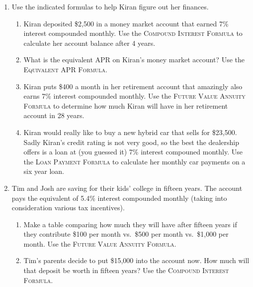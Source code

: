 \begin{enumerate}
\item Use the indicated formulas to help Kiran figure out her finances.
\begin{enumerate}
\item Kiran deposited \$2,500 in a money market account that earned 7\% interest compounded monthly.  Use the \textsc{Compound Interest Formula} to calculate her account balance after 4 years. \vfill
\item What is the equivalent APR on Kiran's money market account?  Use the \textsc{Equivalent APR Formula.} \vfill
\item Kiran puts \$400 a month in her retirement account that amazingly also earns 7\% interest compounded monthly.  Use the \textsc{Future Value Annuity Formula} to determine how much Kiran will have in her retirement account in 28 years. \vfill
\item Kiran would really like to buy a new hybrid car that sells for \$23,500.  Sadly Kiran's credit rating is not very good, so the best the dealership offers is a loan at (you guessed it) 7\% interest compouned monthly.  Use the \textsc{Loan Payment Formula} to calculate her monthly car payments on a six year loan. \vfill
\end{enumerate}

\newpage %

\item Tim and Josh are saving for their kids' college in fifteen years. The account pays the equivalent of 5.4\% interest compounded monthly (taking into consideration various tax incentives). 
 \begin{enumerate}
\item Make a table comparing how much they will have after fifteen years if  they contribute  \$100 per month vs.\ \$500 per month vs.\ \$1,000 per month. Use the \textsc{Future Value Annuity Formula}. \vfill  \vfill \vfill
\item Tim's parents decide to put \$15,000 into the account now.  How much will that deposit be worth in fifteen years?  Use the \textsc{Compound Interest Formula}.  \vfill  \vfill
\end{enumerate}


\end{enumerate}
